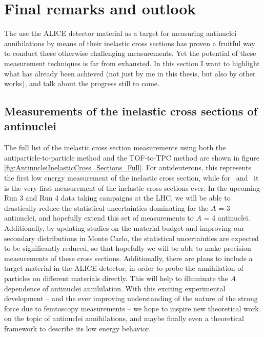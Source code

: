 \section{Final remarks and outlook}

The use the ALICE detector material as a target for measuring antinuclei annihilations by means of their inelastic cross sections has proven a fruitful way to conduct these otherwise challenging measurements. Yet the potential of these measurement techniques is far from exhausted. In this section I want to highlight what has already been achieved (not just by me in this thesis, but also by other works), and talk about the progress still to come. \\

\subsection{Measurements of the inelastic cross sections of antinuclei}

The full list of the inelastic cross section measurements using both the antiparticle-to-particle method and the TOF-to-TPC method are shown in figure \ref{fig:AntinucleiInelasticCross_Sections_Full}. For antideuterons, this represents the first low energy measurement of the inelastic cross section, while for \ahe\ and \atrit\ it is the very first measurement of the inelastic cross sections ever. In the upcoming Run 3 and Run 4 data taking campaigns at the LHC, we will be able to drastically reduce the statistical uncertainties dominating for the $A$ = 3 antinuclei, and hopefully extend this set of measurements to $A$ = 4 antinuclei. Additionally, by updating studies on the material budget and improving our secondary distributions in Monte Carlo, the statistical uncertainties are expected to be significantly reduced, so that hopefully we will be able to make precision measurements of these cross sections. Additionally, there are plans to include a target material in the ALICE detector\cite{}, in order to probe the annihilation of particles on different materials directly. This will help to illuminate the $A$ dependence of antinuclei annihilation. With this exciting experimental development -- and the ever improving understanding of the nature of the strong force due to femtoscopy measurements \cite{} --%
we hope to inspire new theoretical work on the topic of antinuclei annihilations, and maybe finally even a theoretical framework to describe its low energy behavior. \\

